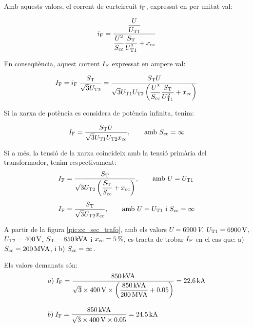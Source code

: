 Amb aquests valors, el corrent de curtcircuit $i_\mathrm{F}$, expressat
en per unitat val:

\begin{equation}
    i_\mathrm{F} = \frac{\dfrac{U}{U_\mathrm{T1}}}{\dfrac{U^2}{S_\mathrm{cc}}
    \dfrac{S_\mathrm{T}}{U_\mathrm{T1}^2} + x_\mathrm{cc}}
\end{equation}

En conseqüència, aquest corrent $I_\mathrm{F}$ expressat en ampere val:

\begin{equation}
    I_\mathrm{F} = i_\mathrm{F}\; \frac{S_\mathrm{T}}{\sqrt{3}U_\mathrm{T2}} =
    \frac{S_\mathrm{T} U}{\sqrt{3} U_\mathrm{T1}U_\mathrm{T2}
    \left(\dfrac{U^2}{S_\mathrm{cc}}
    \dfrac{S_\mathrm{T}}{U_\mathrm{T1}^2} + x_\mathrm{cc}\right)}
\end{equation}

Si la xarxa de potència es considera de potència infinita, tenim:

\begin{equation}
    I_\mathrm{F} = \frac{S_\mathrm{T} U}{\sqrt{3} U_\mathrm{T1}U_\mathrm{T2}
    x_\mathrm{cc}},\qquad \text{amb }S_\mathrm{cc}=\infty
\end{equation}

Si a més, la tensió de la xarxa coincideix amb la tensió primària
del transformador, tenim respectivament:
\begin{align}
    I_\mathrm{F} &= \frac{S_\mathrm{T}}{\sqrt{3} U_\mathrm{T2}
    \left(\dfrac{S_\mathrm{T}}{S_\mathrm{cc}} +
    x_\mathrm{cc}\right)},\qquad \text{amb }U=U_\mathrm{T1}\\[1ex]
    I_\mathrm{F} &= \frac{S_\mathrm{T}}{\sqrt{3} U_\mathrm{T2}
    x_\mathrm{cc}}, \qquad \text{amb }U=U_\mathrm{T1}\text{ i }
    S_\mathrm{cc}=\infty
\end{align}


\begin{exemple}[\CorrentCcSecTrafo{}]
	\addcontentsxms{\CorrentCcSecTrafo}
    A partir de la figura \vref{pic:cc_sec_trafo}, amb els valors
    $U=\qty{6900}{V}$, $U_\mathrm{T1}=\qty{6900}{V}$,
    $U_\mathrm{T2}=\qty{400}{V}$, $S_\mathrm{T}=\qty{850}{kVA}$ i
    $x_\mathrm{cc}=\qty{5}{\percent}$, es tracta de trobar $I_\mathrm{F}$ en el cas
    que: a) $S_\mathrm{cc}=\qty{200}{MVA}$, i b) $S_\mathrm{cc}=\infty$.

    Els valors demanats són:
    \begin{align*}
       &a)\;I_\mathrm{F} = \frac{\qty{850}{kVA}}{\sqrt{3}\times \qty{400}{V}\times
       \left(\dfrac{\qty{850}{kVA}}{\qty{200}{MVA}} +
       \num{0,05}\right)} = \qty{22,6}{kA} \\[2ex]
       &b)\;I_\mathrm{F} = \frac{\qty{850}{kVA}}{\sqrt{3}\times \qty{400}{V}\times
       \num{0,05}} = \qty{24,5}{kA}
    \end{align*}

\end{exemple}



